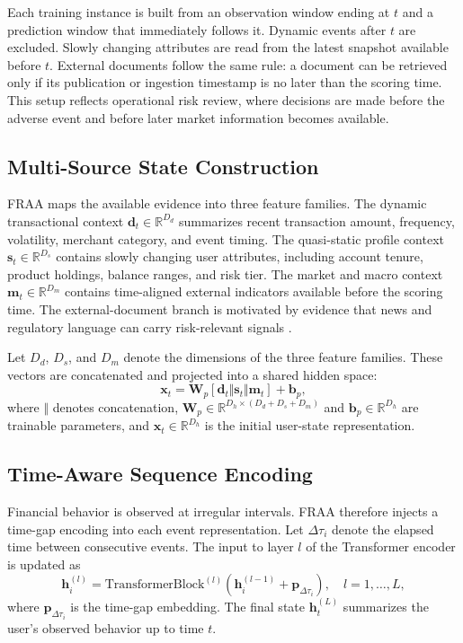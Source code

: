 \documentclass[runningheads]{llncs}
\begin{document}
Each training instance is built from an observation window ending at $t$ and a prediction window that immediately follows it. Dynamic events after $t$ are excluded. Slowly changing attributes are read from the latest snapshot available before $t$. External documents follow the same rule: a document can be retrieved only if its publication or ingestion timestamp is no later than the scoring time. This setup reflects operational risk review, where decisions are made before the adverse event and before later market information becomes available.

\subsection{Multi-Source State Construction}
FRAA maps the available evidence into three feature families. The dynamic transactional context $\mathbf{d}_t \in \mathbb{R}^{D_d}$ summarizes recent transaction amount, frequency, volatility, merchant category, and event timing. The quasi-static profile context $\mathbf{s}_t \in \mathbb{R}^{D_s}$ contains slowly changing user attributes, including account tenure, product holdings, balance ranges, and risk tier. The market and macro context $\mathbf{m}_t \in \mathbb{R}^{D_m}$ contains time-aligned external indicators available before the scoring time. The external-document branch is motivated by evidence that news and regulatory language can carry risk-relevant signals \cite{tetlock2007giving,loughran2011liability}.

Let $D_d$, $D_s$, and $D_m$ denote the dimensions of the three feature families. These vectors are concatenated and projected into a shared hidden space:
\begin{equation}
\mathbf{x}_t = \mathbf{W}_p [\mathbf{d}_t \Vert \mathbf{s}_t \Vert \mathbf{m}_t] + \mathbf{b}_p,
\label{eq:state_projection}
\end{equation}
where $\Vert$ denotes concatenation, $\mathbf{W}_p \in \mathbb{R}^{D_h \times (D_d+D_s+D_m)}$ and $\mathbf{b}_p \in \mathbb{R}^{D_h}$ are trainable parameters, and $\mathbf{x}_t \in \mathbb{R}^{D_h}$ is the initial user-state representation.

\subsection{Time-Aware Sequence Encoding}
Financial behavior is observed at irregular intervals. FRAA therefore injects a time-gap encoding into each event representation. Let $\Delta \tau_i$ denote the elapsed time between consecutive events. The input to layer $l$ of the Transformer encoder is updated as
\begin{equation}
\mathbf{h}_i^{(l)} =
\mathrm{TransformerBlock}^{(l)}\left(\mathbf{h}_i^{(l-1)} + \mathbf{p}_{\Delta \tau_i}\right),
\quad l=1,\ldots,L,
\label{eq:time_transformer}
\end{equation}
where $\mathbf{p}_{\Delta \tau_i}$ is the time-gap embedding. The final state $\mathbf{h}_t^{(L)}$ summarizes the user's observed behavior up to time $t$.
\end{document}
